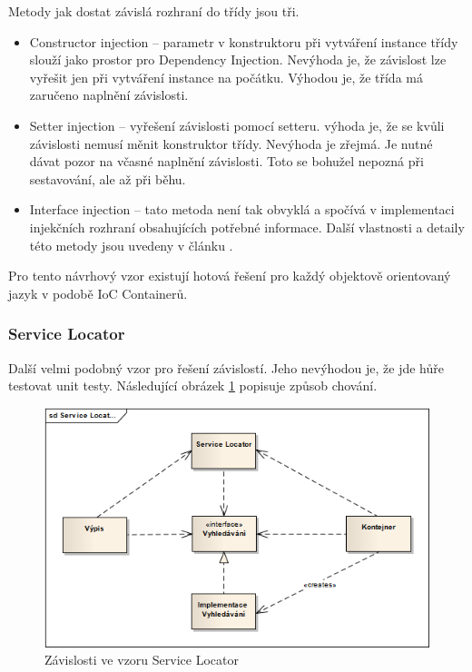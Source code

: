 \documentclass[11pt,twoside,a4paper]{book}
\begin{document}
Metody jak dostat závislá rozhraní do třídy jsou tři.

\begin{itemize}
\item Constructor injection -- parametr v konstruktoru při vytváření instance třídy slouží jako prostor pro Dependency Injection. Nevýhoda je, že závislost lze vyřešit jen při vytváření instance na počátku. Výhodou je, že třída má zaručeno naplnění závislosti.
\item Setter injection -- vyřešení závislosti pomocí setteru. výhoda je, že se kvůli závislosti nemusí měnit konstruktor třídy. Nevýhoda je zřejmá. Je nutné dávat pozor na včasné naplnění závislosti. Toto se bohužel nepozná při sestavování, ale až při běhu.
\item Interface injection -- tato metoda není tak obvyklá a spočívá v implementaci injekčních rozhraní obsahujících potřebné informace. Další vlastnosti a detaily této metody jsou uvedeny v článku \cite{injection}.
\end{itemize}

Pro tento návrhový vzor existují hotová řešení pro každý objektově orientovaný jazyk v podobě IoC Containerů.

\subsubsection{Service Locator}

Další velmi podobný vzor pro řešení závislostí. Jeho nevýhodou je, že jde hůře testovat unit testy. Následující obrázek \ref{fig:servicelocator} popisuje způsob chování.

\begin{figure}[h!]
\begin{center}
\includegraphics[scale=0.75]{figures/servicelocator}
\caption{Závislosti ve vzoru Service Locator}
\label{fig:servicelocator}
\end{center}
\end{figure}
\end{document}
